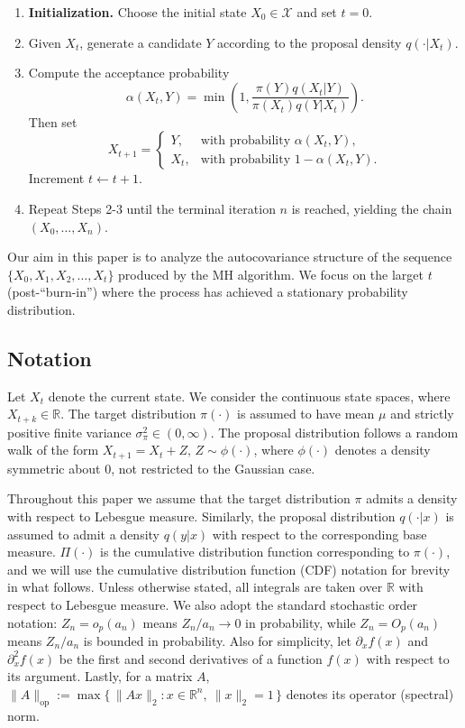 \documentclass[conference]{IEEEtran}
\theoremstyle{definition}
\begin{document}
\begin{enumerate}[leftmargin=3.7em,label=\textbf{Step \arabic*.}]
  \item \textbf{Initialization.} Choose the initial state $X_0 \in \mathcal{X}$ and set $t=0$.
  \item Given $X_t$, generate a candidate $Y$ according to the proposal density $q(\cdot | X_t)$.
  \item Compute the acceptance probability
  \[
    \alpha(X_t,Y) = \min\!\left(1, \frac{\pi(Y)q(X_t | Y)}{\pi(X_t)q(Y | X_t)}\right).
  \]
  Then set
  \[
    X_{t+1} =
      \begin{cases}
        Y, & \text{with probability } \alpha(X_t,Y), \\[6pt]
        X_t, & \text{with probability } 1-\alpha(X_t,Y).
      \end{cases}
  \]
  Increment $t \gets t+1$.
  \item Repeat Steps 2-3 until the terminal iteration $n$ is reached, yielding the chain $(X_0,\dots,X_n)$.
\end{enumerate}

Our aim in this paper is to analyze the autocovariance structure of the sequence \(\{X_0,X_1,X_2,\ldots,X_t\}\) produced by the MH algorithm. We focus on the larget \(t\) (post-``burn-in'') where the process has achieved a stationary probability distribution.

\subsection{Notation}
Let $X_t$ denote the current state. We consider the continuous state spaces, 
where $X_{t+k} \in \mathbb{R}$. 
The target distribution $\pi(\cdot)$ is assumed to have mean $\mu$ and strictly positive finite variance $\sigma_{\pi}^2 \in (0,\infty)$.
 The proposal distribution follows a random walk of the form \(X_{t+1} = X_t + Z, \, Z \sim \phi(\cdot)\), where $\phi(\cdot)$ denotes a density symmetric about 0, not restricted to the Gaussian case.

Throughout this paper we assume that the target distribution $\pi$ admits a density 
with respect to Lebesgue measure. 
Similarly, the proposal distribution $q(\cdot|x)$ is assumed to admit a density $q(y|x)$ 
with respect to the corresponding base measure. $\Pi(\cdot)$ is the cumulative distribution function corresponding to $\pi(\cdot)$, and we will use the cumulative distribution function (CDF) notation for brevity in what follows. Unless otherwise stated, all integrals are taken over $\mathbb{R}$ with respect to Lebesgue measure. 
We also adopt the standard stochastic order notation: 
$Z_n=o_p(a_n)$ means $Z_n/a_n \to 0$ in probability, 
while $Z_n=O_p(a_n)$ means $Z_n/a_n$ is bounded in probability. Also for simplicity, let $\partial_x f(x)$ and $\partial_x^2 f(x)$ be the first and second derivatives of a function $f(x)$ with respect to its argument. Lastly, for a matrix $A$, $\|A\|_{\mathrm{op}}
:= \max\{\,\|Ax\|_2 : x\in\mathbb{R}^n,\ \|x\|_2=1\,\}$ denotes its operator (spectral) norm.
\end{document}
